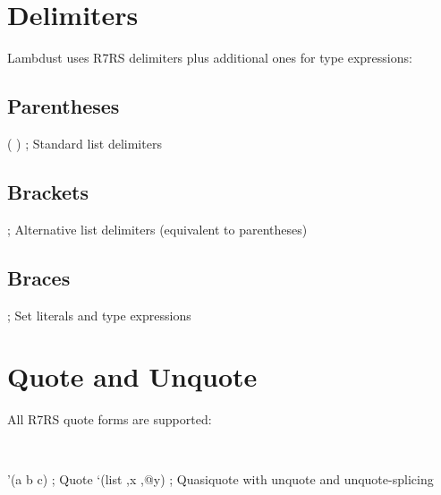 \section{Delimiters}
\label{sec:delimiters}

Lambdust uses R7RS delimiters plus additional ones for type expressions:

\subsection{Parentheses}
\label{subsec:parens}

\begin{lambdustcode}
( )     ; Standard list delimiters
\end{lambdustcode}

\subsection{Brackets}
\label{subsec:brackets}

\begin{lambdustcode}
[ ]     ; Alternative list delimiters (equivalent to parentheses)
\end{lambdustcode}

\subsection{Braces}
\label{subsec:braces}

\begin{lambdustcode}
{ }     ; Set literals and type expressions
\end{lambdustcode}

\section{Quote and Unquote}
\label{sec:quote}

All R7RS quote forms are supported:

\begin{grammar}
\\
\end{grammar}

\begin{example}
\begin{lambdustcode}
'(a b c)        ; Quote
`(list ,x ,@y)  ; Quasiquote with unquote and unquote-splicing
\end{lambdustcode}
\end{example}

